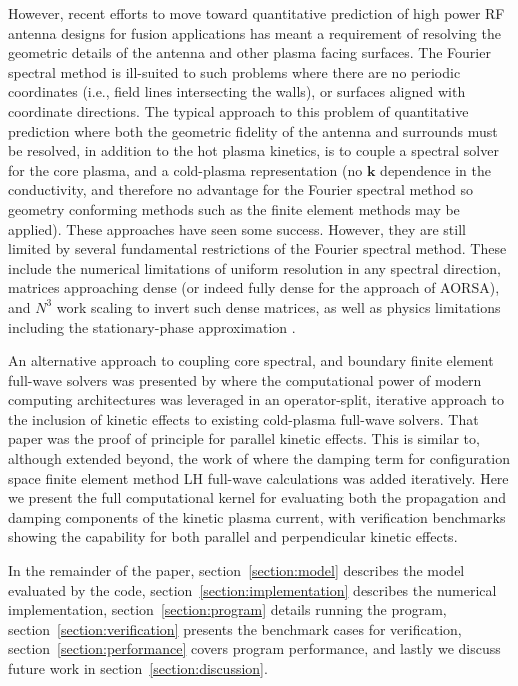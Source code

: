 \documentclass[final,5p,times,twocolumn]{elsarticle}
\renewcommand{\vec}[1]{\mathbf{#1}}
\begin{document}
However, recent efforts \cite[e.g.,][]{bertelli2014,wright2015,jenkins2015} to move toward quantitative prediction of high power RF antenna designs for fusion applications has meant a requirement of resolving the geometric details of the antenna and other plasma facing surfaces. The Fourier spectral method is ill-suited to such problems where there are no periodic coordinates (i.e., field lines intersecting the walls), or surfaces aligned with coordinate directions. The typical approach to this problem of quantitative prediction where both the geometric fidelity of the antenna and surrounds must be resolved, in addition to the hot plasma kinetics, is to couple a spectral solver for the core plasma, and a cold-plasma representation (no $\vec{k}$ dependence in the conductivity, and therefore no advantage for the Fourier spectral method so geometry conforming methods such as the finite element methods may be applied). These approaches have seen some success. However, they are still limited by several fundamental restrictions of the Fourier spectral method. These include the numerical limitations of uniform resolution in any spectral direction, matrices approaching dense (or indeed fully dense for the approach of AORSA), and $N^3$ work scaling to invert such dense matrices, as well as physics limitations including the stationary-phase approximation \cite{stix,brambilla}.  

An alternative approach to coupling core spectral, and boundary finite element full-wave solvers was presented by \cite{green2014} where the computational power of modern computing architectures was leveraged in an operator-split, iterative approach to the inclusion of kinetic effects to existing cold-plasma full-wave solvers. That paper was the proof of principle for parallel kinetic effects. This is similar to, although extended beyond, the work of \cite{meneghini2009,shiraiwa2010a} where the damping term for configuration space finite element method LH full-wave calculations was added iteratively. Here we present the full computational kernel for evaluating both the propagation and damping components of the kinetic plasma current, with verification benchmarks showing the capability for both parallel and perpendicular kinetic effects.

In the remainder of the paper, section~\ref{section:model} describes the model evaluated by the code, section~\ref{section:implementation} describes the numerical implementation, section~\ref{section:program} details running the program, section~\ref{section:verification} presents the benchmark cases for verification, section~\ref{section:performance} covers program performance, and lastly we discuss future work in section~\ref{section:discussion}.
%
\end{document}
